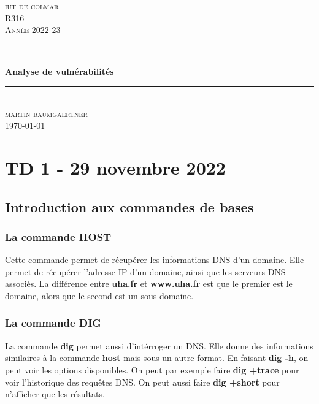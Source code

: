 \documentclass[12pt, a4paper]{article}
\begin{document}
\begin{titlepage}
	\newcommand{\HRule}{\rule{\linewidth}{0.5mm}} 
	\center 
	\textsc{\LARGE iut de colmar}\\[6.5cm] 
	\textsc{\Large R316}\\[0.5cm] 
	\textsc{\large Année 2022-23}\\[0.5cm]
	\HRule\\[0.75cm]
	{\huge\bfseries Analyse de vulnérabilités}\\[0.4cm]
	\HRule\\[1.5cm]
	\textsc{\large martin baumgaertner}\\[6.5cm] 

	\vfill\vfill\vfill
	{\large\today} 
	\vfill
\end{titlepage}
\newpage
\tableofcontents
\listoflistings
\newpage
\section{TD 1 - 29 novembre 2022}
\subsection{Introduction aux commandes de bases}
\subsubsection{La commande HOST}
Cette commande permet de récupérer les informations DNS d'un domaine. 
Elle permet de récupérer l'adresse IP d'un domaine, ainsi que les serveurs
DNS associés. La différence entre \textbf{uha.fr} et \textbf{www.uha.fr} est
que le premier est le domaine, alors que le second est un sous-domaine.

\subsubsection{La commande DIG}
La commande \textbf{dig} permet aussi d'intérroger un DNS. Elle donne des informations similaires
à la commande \textbf{host} mais sous un autre format. En faisant \textbf{dig -h}, on peut voir
les options disponibles. On peut par exemple faire \textbf{dig +trace} pour voir
l'historique des requêtes DNS. On peut aussi faire \textbf{dig +short} pour n'afficher
que les résultats. 
\end{document}
